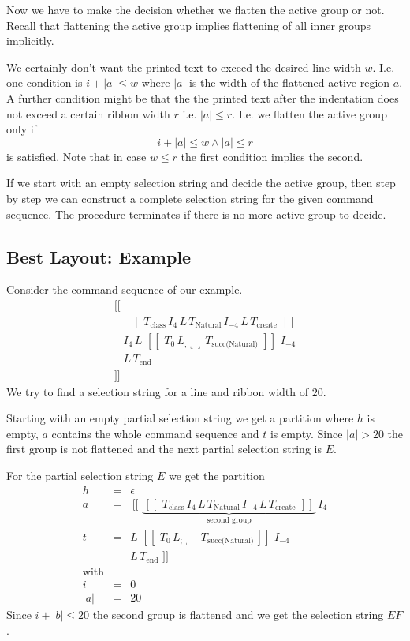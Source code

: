 \documentclass[12pt]{article}
\def\blank{\llcorner\!\!\lrcorner}
\def\class{\text{class}}
\def\create{\text{create}}
\def\kwend{\text{end}}
\def\GS{\,[\![\,}
\def\GE{\,]\!]\,}
\def\Natural{\text{Natural}}
\begin{document}
Now we have to make the decision whether we flatten the active group or
not. Recall that flattening the active group implies flattening of all inner
groups implicitly.

We certainly don't want the printed text to exceed the desired line width
$w$. I.e. one condition is $i + |a| \le w$ where $|a|$ is the width of the
flattened active region $a$. A further condition might be that the the printed
text after the indentation does not exceed a certain ribbon width $r$
i.e. $|a| \le r$. I.e. we flatten the active group only if
$$
i + |a| \le w \land |a| \le r
$$
is satisfied. Note that in case $w \le r$ the first condition implies the
second.

If we start with an empty selection string and decide the active group, then
step by step we can construct a complete selection string for the given
command sequence. The procedure terminates if there is no more active group to
decide.


\subsection{Best Layout: Example}

Consider the command sequence of our example.
$$
\begin{array}{l}
  \GS \, \\
  \quad
  \GS \, T_\class\,
     I_4\, L\, T_\Natural\, I_{-4}\,
  L\, T_\create\, \GE
  \\
  \quad I_4\, L\,
  \GS\, T_0\, L_{;\blank}\, T_\text{succ(Natural)}\, \GE\,
  I_{-4} \\
  \quad L \, T_\kwend \, \\
  \GE
\end{array}
$$
%
We try to find a selection string for a line and ribbon width of $20$.

Starting with an empty partial selection string we get a partition where $h$
is empty, $a$ contains the whole command sequence and $t$ is empty. Since $|a|
> 20$ the first group is not flattened and the next partial selection string
is $E$.


For the partial selection string $E$ we get the partition
$$
\begin{array}{lll}
  h &=& \epsilon
  \\
  a &=& \GS \,
        \underbrace{
        \GS \, T_\class\,
        I_4\, L\, T_\Natural\, I_{-4}\, L \, T_\create\, \GE
        }_{\text{second group}} \, I_4
  \\
  t  & = &  L\,
           \GS\, T_0\, L_{;\blank}\, T_\text{succ(Natural)}
           \GE \, I_{-4}\, \\
    & & L \, T_\kwend \, \GE
  \\
  \text{with} \\
  i & = & 0
  \\
  |a| & = & 20 %
\end{array}
$$%
Since $i + |b| \le 20$ the second group is flattened and we get the selection
string $EF$.
\end{document}
